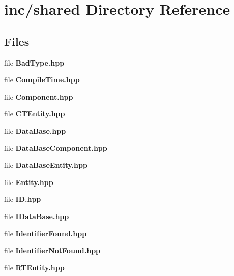 \section{inc/shared Directory Reference}
\label{dir_ecda0f287c307d056b3c2cb239b6c6d3}
\subsection*{Files}
\begin{DoxyCompactItemize}
\item 
file {\bf Bad\+Type.\+hpp}
\item 
file {\bf Compile\+Time.\+hpp}
\item 
file {\bf Component.\+hpp}
\item 
file {\bf C\+T\+Entity.\+hpp}
\item 
file {\bf Data\+Base.\+hpp}
\item 
file {\bf Data\+Base\+Component.\+hpp}
\item 
file {\bf Data\+Base\+Entity.\+hpp}
\item 
file {\bf Entity.\+hpp}
\item 
file {\bf I\+D.\+hpp}
\item 
file {\bf I\+Data\+Base.\+hpp}
\item 
file {\bf Identifier\+Found.\+hpp}
\item 
file {\bf Identifier\+Not\+Found.\+hpp}
\item 
file {\bf R\+T\+Entity.\+hpp}
\end{DoxyCompactItemize}
